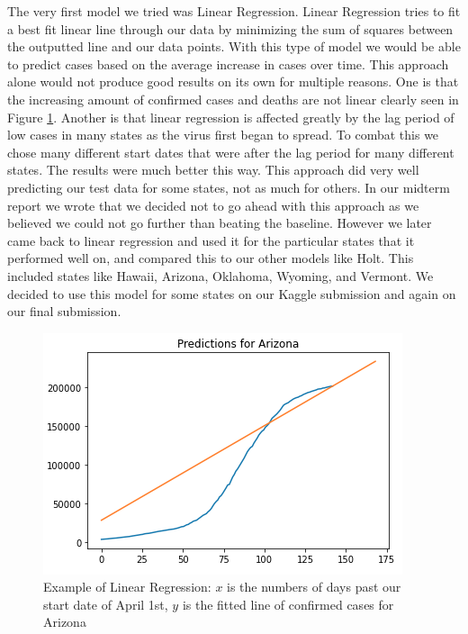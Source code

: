 \documentclass[sigconf,nonacm]{acmart}
\begin{document}
The very first model we tried was Linear Regression. Linear Regression tries to
fit a best fit linear line through our data by minimizing the sum of squares
between the outputted line and our data points\cite{scikit-learn}. With this
type of model we would be able to predict cases based on the average increase
in cases over time. This approach alone would not produce good results on its
own for multiple reasons. One is that the increasing amount of confirmed cases
and deaths are not linear clearly seen in Figure \ref{fig:linreg}. Another is
that linear regression is affected greatly by the lag period of low cases in
many states as the virus first began to spread. To combat this we chose many
different start dates that were after the lag period for many different states.
The results were much better this way. This approach did very well predicting
our test data for some states, not as much for others. In our midterm report we
wrote that we decided not to go ahead with this approach as we believed we
could not go further than beating the baseline. However we later came back to
linear regression and used it for the particular states that it performed well
on, and compared this to our other models like Holt. This included states like
Hawaii, Arizona, Oklahoma, Wyoming, and Vermont. We decided to use this model
for some states on our Kaggle submission and again on our final submission. 

\begin{figure}
  \centering
  \includegraphics[width=\linewidth]{figures/7-linear-reg.png}
  \caption{Example of Linear Regression: $x$ is the numbers of days past our
  start date of April 1st, $y$ is the fitted line of confirmed cases for
  Arizona}
  \label{fig:linreg}
\end{figure}
\end{document}
